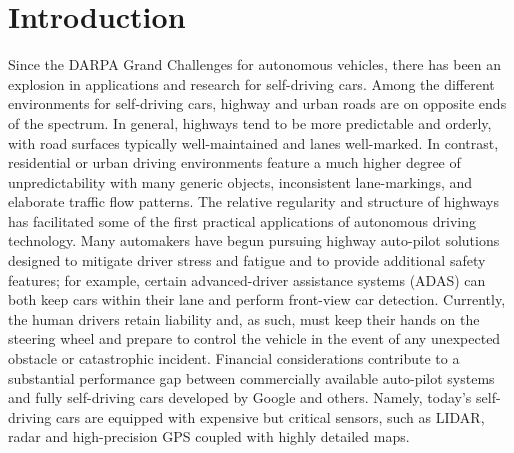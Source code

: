 \documentclass[journal]{IEEEtran}
\begin{document}
\IEEEpeerreviewmaketitle



\section{Introduction}
Since the DARPA Grand Challenges for autonomous vehicles, there has been an explosion in applications and research for self-driving cars. Among the different environments for self-driving cars, highway and urban roads are on opposite ends of the spectrum. In general, highways tend to be more predictable and orderly, with road surfaces typically well-maintained and lanes well-marked. In contrast, residential or urban driving environments feature a much higher degree of unpredictability with many generic objects, inconsistent lane-markings, and elaborate traffic flow patterns. The relative regularity and structure of highways has facilitated some of the first practical applications of autonomous driving technology. Many automakers have begun pursuing highway auto-pilot solutions designed to mitigate driver stress and fatigue and to provide additional safety features; for example, certain advanced-driver assistance systems (ADAS) can both keep cars within their lane and perform front-view car detection. Currently, the human drivers retain liability and, as such, must keep their hands on the steering wheel and prepare to control the vehicle in the event of any unexpected obstacle or catastrophic incident. Financial considerations contribute to a substantial performance gap between commercially available auto-pilot systems and fully self-driving cars developed by Google and others. Namely, today's self-driving cars are equipped with expensive but critical sensors, such as LIDAR, radar and high-precision GPS coupled with highly detailed maps.
\end{document}

